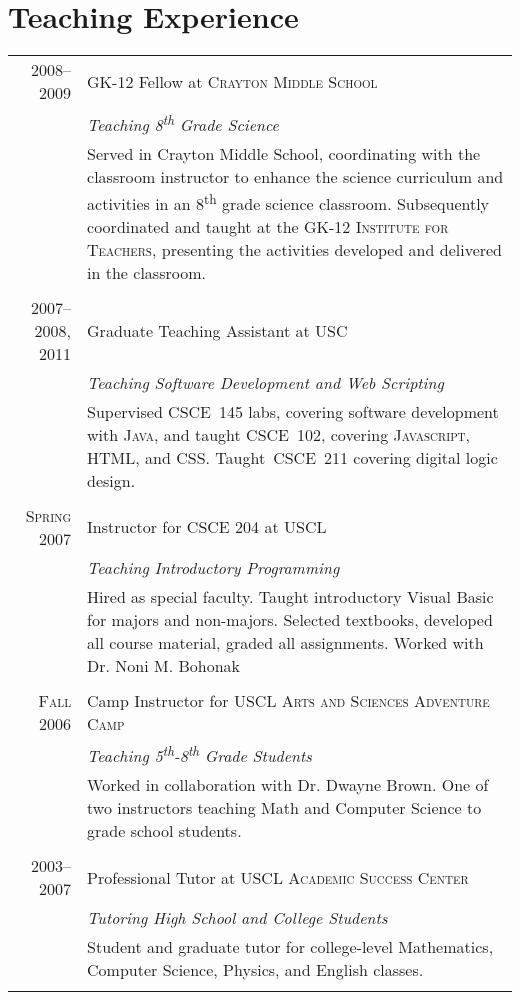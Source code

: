 \documentclass[a4paper,10pt]{article}
\begin{document}
\section{Teaching Experience}
\begin{longtable}{r|p{11cm}}
\textsc{2008--2009}
& GK-12 Fellow at \textsc{Crayton Middle School} \\
&\emph{Teaching 8\textsuperscript{th} Grade Science}\\
&\footnotesize{Served in Crayton Middle School, coordinating with the classroom instructor to enhance the science curriculum and activities in an 8\textsuperscript{th} grade science classroom. Subsequently coordinated and taught at the \textsc{GK-12 Institute for Teachers}, presenting the activities developed and delivered in the classroom.}
\\\multicolumn{2}{c}{} \\
\textsc{2007--2008, 2011} & Graduate Teaching Assistant at \textsc{USC} \\
&\emph{Teaching Software Development and Web Scripting}\\
&\footnotesize{Supervised CSCE~145 labs, covering software development with \textsc{Java}, and taught CSCE~102, covering \textsc{Javascript}, \textsc{HTML}, and \textsc{CSS}. Taught~CSCE~211 covering digital logic design.}\\\multicolumn{2}{c}{} \\
\textsc{Spring 2007} &  Instructor for \textsc{CSCE 204} at \textsc{USCL} \\
&\emph{Teaching Introductory Programming}\\
&\footnotesize{Hired as special faculty. Taught introductory Visual Basic for majors and non-majors. Selected textbooks, developed all course material, graded all assignments. Worked with Dr. Noni M. Bohonak}\\\multicolumn{2}{c}{} \\
\textsc{Fall 2006} & Camp Instructor for \textsc{USCL Arts and Sciences Adventure Camp} \\
&\emph{Teaching 5\textsuperscript{th}-8\textsuperscript{th} Grade Students}\\
&\footnotesize{Worked in collaboration with Dr. Dwayne Brown. One of two instructors teaching Math and Computer Science to grade school students.}\\\multicolumn{2}{c}{} \\
\textsc{2003--2007} & Professional Tutor at \textsc{USCL Academic Success Center} \\
&\emph{Tutoring High School and College Students}\\
&\footnotesize{Student and graduate tutor for college-level Mathematics, Computer Science, Physics, and English classes.}\\\multicolumn{2}{c}{} \\
\end{longtable}
\end{document}
